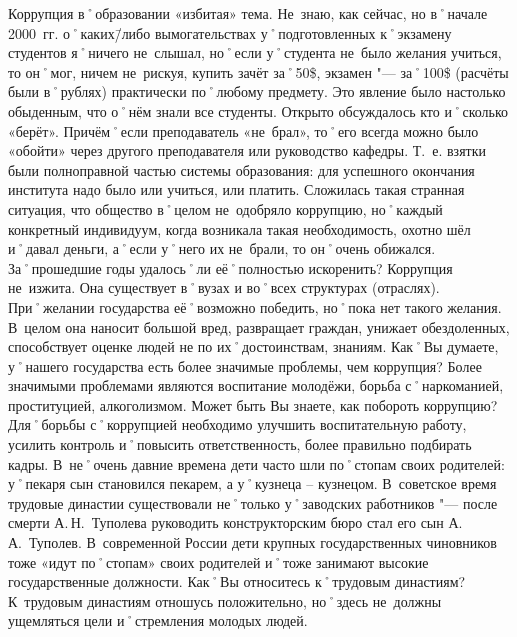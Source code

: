 \begin{drama}
	\maxspeaks Коррупция в˚образовании  «избитая» тема. Не~знаю, как сейчас, но в˚начале 2000~гг. о˚каких\=/либо вымогательствах у˚подготовленных к˚экзамену студентов я˚ничего не~слышал, но˚если у˚студента не~было желания учиться, то он˚мог, ничем не~рискуя, купить зачёт за˚50\$, экзамен "--- за˚100\$ (расчёты были в˚рублях) практически по˚любому предмету. Это явление было настолько обыденным, что о˚нём знали все студенты. Открыто обсуждалось кто и˚сколько  «берёт». Причём˚если преподаватель  «не~брал», то˚его всегда можно было  «обойти» через другого преподавателя или руководство кафедры. Т.~е. взятки были полноправной частью системы образования: для успешного окончания института надо было или учиться, или платить. Сложилась такая странная ситуация, что общество в˚целом не~одобряло коррупцию, но˚каждый конкретный индивидуум, когда возникала такая необходимость, охотно шёл и˚давал деньги, а˚если у˚него их не~брали, то он˚очень обижался. За˚прошедшие годы удалось˚ли её˚полностью искоренить?
	\michaelspeaks Коррупция не~изжита. Она существует в˚вузах и во˚всех структурах (отраслях). При˚желании государства её˚возможно победить, но˚пока нет такого желания. В~целом она наносит большой вред, развращает граждан, унижает обездоленных, способствует оценке людей не по их˚достоинствам, знаниям.
	\maxspeaks Как˚Вы думаете, у˚нашего государства есть более значимые проблемы, чем коррупция?
	\michaelspeaks Более значимыми проблемами являются воспитание молодёжи, борьба с˚наркоманией, проституцией, алкоголизмом.
	\maxspeaks Может быть Вы знаете, как побороть коррупцию? 
	\michaelspeaks Для˚борьбы с˚коррупцией необходимо улучшить воспитательную работу, усилить контроль и˚повысить ответственность, более правильно подбирать кадры.
	\maxspeaks В~не˚очень давние времена дети часто шли по˚стопам своих родителей: у˚пекаря сын становился пекарем, а у˚кузнеца – кузнецом. В~советское время трудовые династии существовали не˚только у˚заводских работников "--- после смерти А.\,Н.~Туполева руководить конструкторским бюро стал его сын А.\,А.~Туполев. В~современной России дети крупных государственных чиновников тоже «идут по˚стопам» своих родителей и˚тоже занимают высокие государственные должности. Как˚Вы относитесь к˚трудовым династиям?
	\michaelspeaks К~трудовым династиям отношусь положительно, но˚здесь не~должны ущемляться цели и˚стремления молодых людей.
	

\end{drama}

